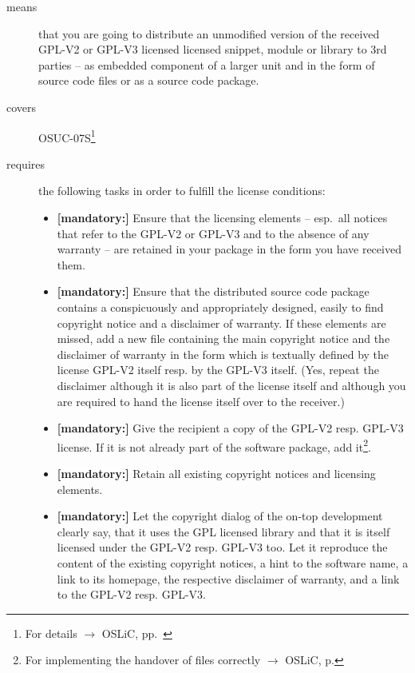 \begin{description}

\item[means] that you are going to distribute an unmodified version of the
received GPL-V2 or GPL-V3 licensed licensed snippet, module or library to 3rd
parties -- as embedded component of a larger unit and in the form of source code
files or as a source code package.

\item[covers] OSUC-07S\footnote{For details $\rightarrow$
OSLiC, pp.\ \pageref{OSUC-07S-DEF}}

\item[requires] the following tasks in order to fulfill the license conditions:
\begin{itemize}
 
  \item \textbf{[mandatory:]} Ensure that the licensing elements -- esp.\ all
  notices that refer to the GPL-V2 or GPL-V3 and to the absence of any
  warranty -- are retained in your package in the form you have received them.

  \item \textbf{[mandatory:]} Ensure that the distributed source code package
  contains a conspicuously and appropriately designed, easily to find copyright
  notice and a disclaimer of warranty. If these elements are missed, add a new
  file containing the main copyright notice and the disclaimer of warranty in the
  form which is textually defined by the license GPL-V2 itself resp. by the
  GPL-V3 itself. (Yes, repeat the disclaimer although it is also part of the
  license itself and although you are required to hand the license itself over
  to the receiver.)
  
  \item \textbf{[mandatory:]} Give the recipient a copy of the GPL-V2 resp.
  GPL-V3 license. If it is not already part of the software package, add
  it\footnote{For implementing the handover of files correctly $\rightarrow$
  OSLiC, p. \pageref{DistributingFilesHint}}.

  \item \textbf{[mandatory:]} Retain all existing copyright notices and
  licensing elements.
    
  \item \textbf{[mandatory:]} Let the copyright dialog of the on-top development
  clearly say, that it uses the GPL licensed library and that it is itself
  licensed under the GPL-V2 resp. GPL-V3 too. Let it reproduce the content of
  the existing copyright notices, a hint to the software name, a link to its
  homepage, the respective disclaimer of warranty, and a link to the GPL-V2
  resp. GPL-V3.    
    

\end{itemize}
\end{description}
